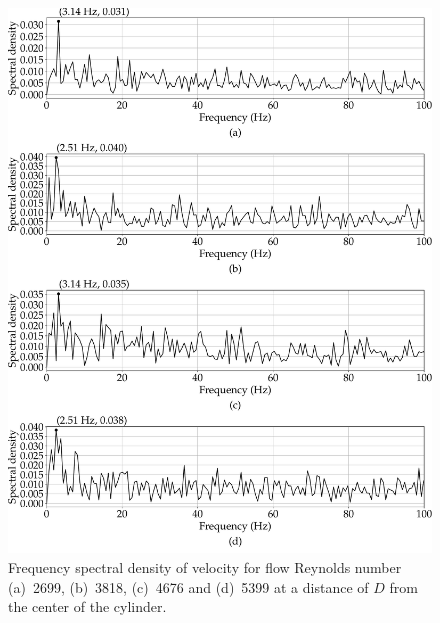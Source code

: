 \begin{figure}
    \centering
    \includegraphics[width=\linewidth]{gfx/FFT_all_freq_x_D_y_0.pdf}
    \caption{Frequency spectral density of velocity for flow Reynolds number (a)~2699, (b)~3818, (c)~4676 and (d)~5399 at a distance of $D$ from the center of the cylinder.}
    \label{fig:surface_x_D_y_0}
\end{figure}

